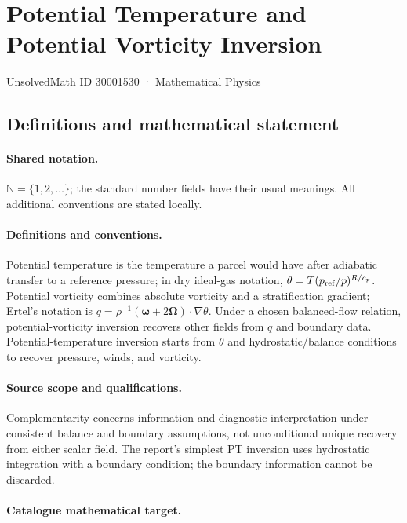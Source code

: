 \documentclass[11pt]{article}
\begin{document}
\setcounter{section}{30001529}
\section{Potential Temperature and Potential Vorticity Inversion}\label{30001530}
{\small UnsolvedMath ID 30001530 · Mathematical Physics}
\subsection{Definitions and mathematical statement}

\paragraph{Shared notation.}$\mathbb N=\{1,2,\ldots\}$; the standard number fields have their usual meanings. All additional conventions are stated locally.


\paragraph{Definitions and conventions.} Potential temperature is the temperature a parcel would have after adiabatic transfer to a reference pressure; in dry ideal-gas notation, $\theta=T(p_{\rm ref}/p)^{R/c_p}$. Potential vorticity combines absolute vorticity and a stratification gradient; Ertel's notation is $q=\rho^{-1}(\boldsymbol\omega+2\boldsymbol\Omega)\cdot\nabla\theta$. Under a chosen balanced-flow relation, potential-vorticity inversion recovers other fields from $q$ and boundary data. Potential-temperature inversion starts from $\theta$ and hydrostatic/balance conditions to recover pressure, winds, and vorticity.

\paragraph{Source scope and qualifications.} Complementarity concerns information and diagnostic interpretation under consistent balance and boundary assumptions, not unconditional unique recovery from either scalar field. The report's simplest PT inversion uses hydrostatic integration with a boundary condition; the boundary information cannot be discarded.

\paragraph{Catalogue mathematical target.}
\end{document}

